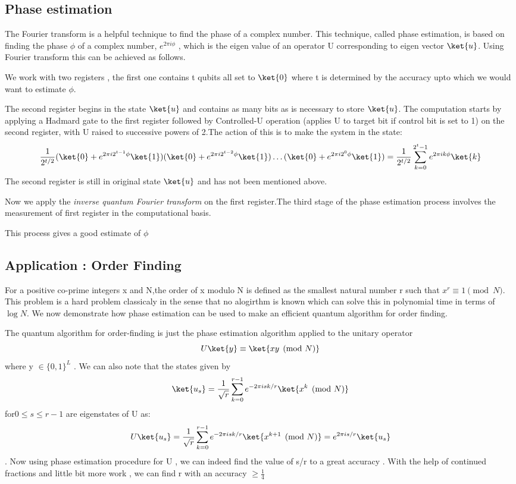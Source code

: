 \subsection{Phase estimation}
The Fourier transform is a helpful technique to find the phase of a complex number. This technique, called phase estimation, is based on finding the phase $\phi$ of a complex number, $e^{2\pi i \phi}$ , which is the eigen value of an operator U corresponding to eigen vector $\ket{u}$. Using Fourier transform this can be achieved as follows.\par
We work with two registers , the first one contains t qubits all set to $\ket{0}$ where t is determined by the accuracy upto which we would want to estimate $\phi$.\par
The second register begins in the state $\ket{u}$ and contains as many bits as is necessary to store $\ket{u}$. The computation starts by applying a Hadmard gate to the first register followed by Controlled-U operation (applies U to target bit if control bit is set to 1) on the second register, with U raised to successive powers of 2.The action of this is to make the system in the state:
$$ \frac{1}{2^{t/2}}(\ket{0} + e^{2\pi i 2^{t-1}\phi}\ket{1})(\ket{0}+e^{2\pi i 2^{t-2} \phi}\ket{1})\hdots (\ket{0} + e^{2\pi i 2^{0}\phi}\ket{1}) = \frac{1}{2^{t/2}}\sum_{k=0}^{2^t-1}e^{2\pi i k\phi}\ket{k} $$
The second register is still in original state $\ket{u}$ and has not been mentioned above.\par
Now we apply the \textit{inverse quantum Fourier transform} on the first register.The third stage of the phase estimation process involves the measurement of first register in the computational basis.\par This process gives a good estimate of $\phi$

\subsection{Application : Order Finding}
For a positive co-prime integers x and N,the order of x modulo N is defined as the smallest natural number r such that $x^r\equiv 1 \pmod N$. This problem is a hard problem classicaly in the sense that no alogirthm is known which can solve this in polynomial time in terms of $\log{N}$. We now demonstrate how phase estimation can be used to make an efficient quantum algorithm for order finding.\par
The quantum algorithm for order-finding is just the phase estimation algorithm applied
to the unitary operator
$$U \ket{y} \equiv \ket{xy\pmod N}$$
where y $\in {\{ 0,1\}}^L $ . We can also note that the states given by 
$$\ket{u_s} = \frac{1}{\sqrt{r}} \sum_{k=0}^{r-1}e^{-2\pi i s k /r} \ket{x^{k}\pmod{N}}$$
for$ 0\leq s \leq r-1 $ are eigenstates of U as:
$$U\ket{u_s} = \frac{1}{\sqrt{r}}  \sum_{k=0}^{r-1}e^{-2\pi i s k /r} \ket{x^{k+1}\pmod{N}} = e^{2 \pi i s /r}\ket{u_s}$$.
Now using phase estimation procedure for U , we can indeed find the value of s/r to a great accuracy . With the help of continued fractions and little bit more work , we can find r with an accuracy $ \geq \frac{1}{4}$

